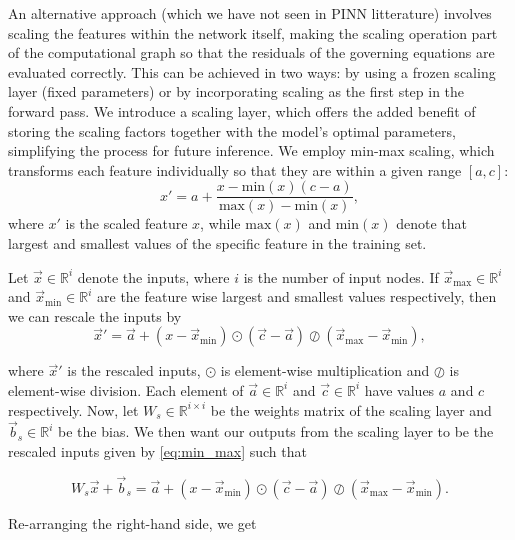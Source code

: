 An alternative approach (which we have not seen in PINN litterature) involves scaling the features within the network itself, making the scaling operation part of the computational graph so that the residuals of the governing equations are evaluated correctly. This can be achieved in two ways: by using a frozen scaling layer (fixed parameters) or by incorporating scaling as the first step in the forward pass.
We introduce a scaling layer, which offers the added benefit of storing the scaling factors together with the model's optimal parameters, simplifying the process for future inference.
We employ min-max scaling, which transforms each feature individually so that they are within a given range $[a,c]$:  
\begin{equation}
    x'=a + \frac{x -\text{min}(x)(c-a)}{\text{max}(x) -\text{min}(x)},
    \label{eq:min_max_single}
\end{equation}
where $x'$ is the scaled feature $x$, while $\text{max}(x)$ and $\text{min}(x)$ denote that largest and smallest values of the specific feature in the training set.

Let $\Vec{x} \in \mathbb{R}^i$ denote the inputs, where $i$ is the number of input nodes. If $\Vec{x}_{\text{max}}\in \mathbb{R}^i$ and $\Vec{x}_{\text{min}}\in \mathbb{R}^i$ are the feature wise largest and smallest values respectively, then we can rescale the inputs by
\begin{equation}
    \vec{x}'=\vec{a} + (x -\Vec{x}_{\text{min}})\odot(\vec{c}-\vec{a})\oslash  (\Vec{x}_{\text{max}}-\Vec{x}_{\text{min}}),
    \label{eq:min_max}
\end{equation}

where $\vec{x}'$ is the rescaled inputs, $\odot$ is element-wise multiplication and $\oslash$ is element-wise division. Each element of $\Vec{a} \in \mathbb{R}^i$ and $\Vec{c} \in \mathbb{R}^i$ have values $a$ and $c$ respectively.
Now, let $W_s \in \mathbb{R}^{i\times i}$ be the weights matrix of the scaling layer and $\vec{b}_s\in \mathbb{R}^i$ be the bias. We then want our outputs from the scaling layer to be the rescaled inputs given by \eqref{eq:min_max} such that

\begin{equation}
    W_s\Vec{x} +\vec{b}_s=\vec{a} + (x -\Vec{x}_{\text{min}})\odot(\vec{c}-\vec{a})\oslash  (\Vec{x}_{\text{max}}-\Vec{x}_{\text{min}}).
    \label{eq:min_max}
\end{equation}

Re-arranging the right-hand side, we get


